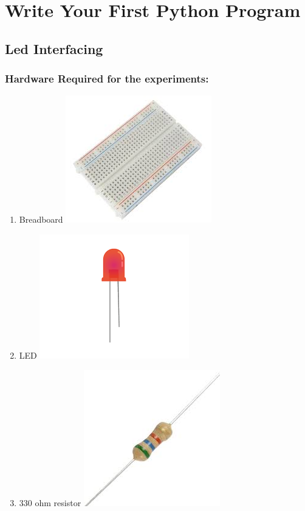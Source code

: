 \documentclass[10pt,red]{beamer}
\begin{document}
\section{Write Your First Python Program}
\subsection{Led Interfacing}
\begin{frame}
	\frametitle{Hardware Required for the experiments:}	\pause
		\begin{enumerate}
			\item<+-|alert@+> Breadboard 	
			\includegraphics[scale=0.3]{breadboard}
			\item<+-|alert@+>  LED
			\includegraphics[scale=0.2]{led}
			\item<+-|alert@+> 330 ohm resistor
			\includegraphics[scale=0.1]{resistor}
			
		\end{enumerate}
\end{frame}
\end{document}
